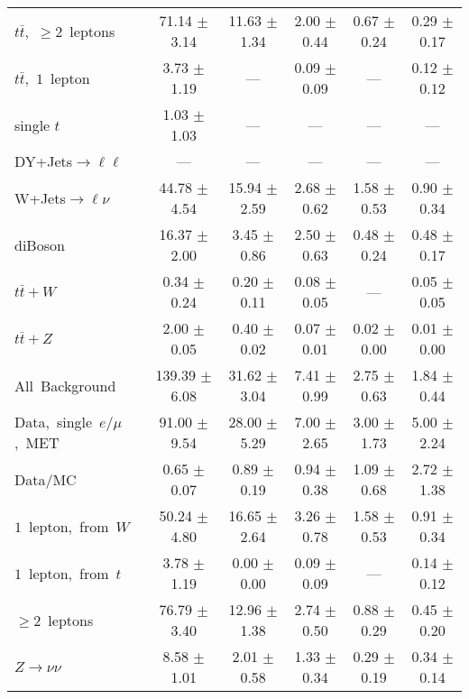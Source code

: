 \documentclass{article}
\begin{document}
\begin{longtable}{|l|c|c|c|c|c|}
$t\bar{t}$,~$\ge2$~leptons & 71.14 $\pm$ 3.14  & 11.63 $\pm$ 1.34  & 2.00 $\pm$ 0.44  & 0.67 $\pm$ 0.24  & 0.29 $\pm$ 0.17 \\* 
$t\bar{t}$,~$1$~lepton & 3.73 $\pm$ 1.19  & ---  & 0.09 $\pm$ 0.09  & ---  & 0.12 $\pm$ 0.12 \\* 
single $t$  & 1.03 $\pm$ 1.03  & ---  & ---  & ---  & --- \\* 
DY+Jets$\rightarrow\ell\ell$  & ---  & ---  & ---  & ---  & --- \\* 
W+Jets$\rightarrow\ell\nu$  & 44.78 $\pm$ 4.54  & 15.94 $\pm$ 2.59  & 2.68 $\pm$ 0.62  & 1.58 $\pm$ 0.53  & 0.90 $\pm$ 0.34 \\* 
diBoson  & 16.37 $\pm$ 2.00  & 3.45 $\pm$ 0.86  & 2.50 $\pm$ 0.63  & 0.48 $\pm$ 0.24  & 0.48 $\pm$ 0.17 \\* 
$t\bar{t}+W$  & 0.34 $\pm$ 0.24  & 0.20 $\pm$ 0.11  & 0.08 $\pm$ 0.05  & ---  & 0.05 $\pm$ 0.05 \\* 
$t\bar{t}+Z$  & 2.00 $\pm$ 0.05  & 0.40 $\pm$ 0.02  & 0.07 $\pm$ 0.01  & 0.02 $\pm$ 0.00  & 0.01 $\pm$ 0.00 \\* 
\hline \hline 
All~Background  & 139.39 $\pm$ 6.08  & 31.62 $\pm$ 3.04  & 7.41 $\pm$ 0.99  & 2.75 $\pm$ 0.63  & 1.84 $\pm$ 0.44 \\* 
Data,~single~$e/\mu$,~MET  & 91.00 $\pm$ 9.54  & 28.00 $\pm$ 5.29  & 7.00 $\pm$ 2.65  & 3.00 $\pm$ 1.73  & 5.00 $\pm$ 2.24 \\* 
Data/MC  & 0.65 $\pm$ 0.07  & 0.89 $\pm$ 0.19  & 0.94 $\pm$ 0.38  & 1.09 $\pm$ 0.68  & 2.72 $\pm$ 1.38 \\* 
\hline \hline 
$1$~lepton,~from~$W$  & 50.24 $\pm$ 4.80  & 16.65 $\pm$ 2.64  & 3.26 $\pm$ 0.78  & 1.58 $\pm$ 0.53  & 0.91 $\pm$ 0.34 \\* 
$1$~lepton,~from~$t$  & 3.78 $\pm$ 1.19  & 0.00 $\pm$ 0.00  & 0.09 $\pm$ 0.09  & ---  & 0.14 $\pm$ 0.12 \\* 
$\ge2$~leptons  & 76.79 $\pm$ 3.40  & 12.96 $\pm$ 1.38  & 2.74 $\pm$ 0.50  & 0.88 $\pm$ 0.29  & 0.45 $\pm$ 0.20 \\* 
$Z\rightarrow\nu\nu$  & 8.58 $\pm$ 1.01  & 2.01 $\pm$ 0.58  & 1.33 $\pm$ 0.34  & 0.29 $\pm$ 0.19  & 0.34 $\pm$ 0.14 \\* 
\hline 
\end{longtable} 

 
 
 
 
\pagebreak 

 
 
 
 
\end{document}
